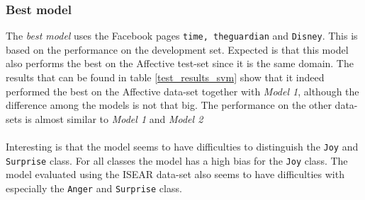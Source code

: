 \documentclass[11pt]{article}
\begin{document}
\subsubsection{Best model}
The \textit{best model} uses the Facebook pages \texttt{time, theguardian} and \texttt{Disney}. This is based on the performance on the development set. Expected is that this model also performs the best on the Affective test-set since it is the same domain. The results that can be found in table \ref{test_results_svm} show that it indeed performed the best on the Affective data-set together with \textit{Model 1}, although the difference among the models is not that big. The performance on the other data-sets is almost similar to  \textit{Model 1} and \textit{Model 2}\\\\
Interesting is that the model seems to have difficulties to distinguish the \texttt{Joy} and \texttt{Surprise} class. For all classes the model has a high bias for the \texttt{Joy} class. The model evaluated using the ISEAR data-set also seems to have difficulties with especially the \texttt{Anger} and \texttt{Surprise} class.
\end{document}
